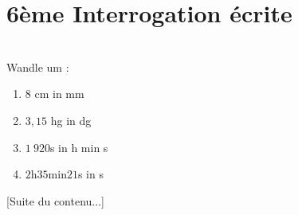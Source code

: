 \documentclass[10pt,openany]{book}
\begin{document}
\pagestyle{empty}
\section*{6\`eme Interrogation \'ecrite}

\\
Wandle um :
\begin{multicols}{2}	
\begin{enumerate}
\item $8$ cm in mm
\item $3,15$ hg in dg
\columnbreak
\item $1~920$s in h min s
\item $2$h$35$min$21$s in s
\end{enumerate}
\end{multicols}

[Suite du contenu...]
\end{document}
